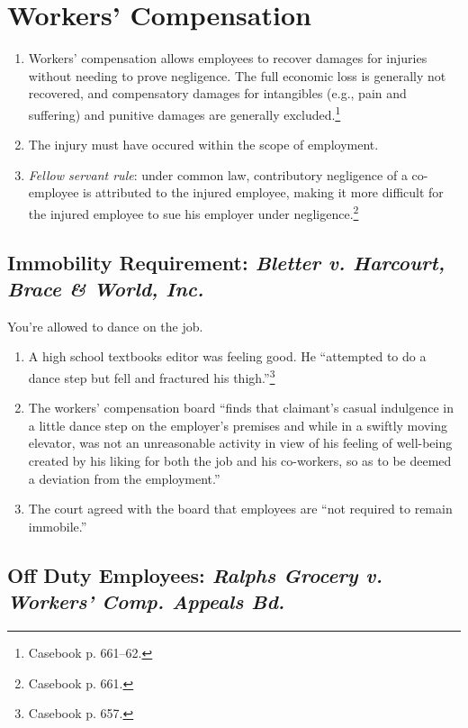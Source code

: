 \section{Workers' Compensation}

\begin{enumerate}
    \item Workers' compensation allows employees to recover damages for 
    injuries without needing to prove negligence. The full economic loss is 
    generally not recovered, and compensatory damages for intangibles (e.g., 
    pain and suffering) and punitive damages are generally 
    excluded.\footnote{Casebook p. 661--62.}
    \item The injury must have occured within the scope of employment.
    \item \emph{Fellow servant rule}: under common law, contributory 
    negligence of a co-employee is attributed to the injured employee, making 
    it more difficult for the injured employee to sue his employer under 
    negligence.\footnote{Casebook p. 661.}
\end{enumerate}

\subsection{Immobility Requirement: \emph{Bletter v. Harcourt, Brace \& World, 
Inc.}}

You're allowed to dance on the job.

\begin{enumerate}
    \item A high school textbooks editor was feeling good. He ``attempted to 
    do a dance step but fell and fractured his thigh.''\footnote{Casebook p.  
    657.}
    \item The workers' compensation board ``finds that claimant's casual 
    indulgence in a little dance step on the employer's premises and while in 
    a swiftly moving elevator, was not an unreasonable activity in view of his 
    feeling of well-being created by his liking for both the job and his 
    co-workers, so as to be deemed a deviation from the employment.''
    \item The court agreed with the board that employees are ``not required to 
    remain immobile.''
\end{enumerate}

\subsection{Off Duty Employees: \emph{Ralphs Grocery v. Workers' Comp. Appeals Bd.}}

